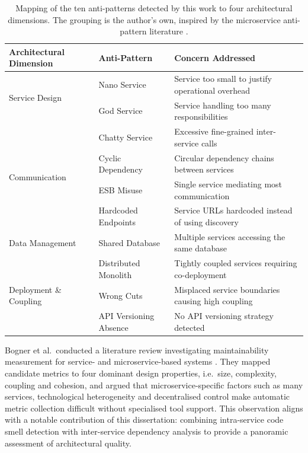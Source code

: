 \begin{table}[htbp]
    \begin{center}
        \small
        \begin{tabular}{|l|l|p{170pt}|}
            \hline
            \textbf{Architectural Dimension} & \textbf{Anti-Pattern} & \textbf{Concern Addressed} \\
            \hline\hline
            \multirow{2}{*}{Service Design}
            & Nano Service   & Service too small to justify operational overhead \\
            \cline{2-3}
            & God Service    & Service handling too many responsibilities \\
            \hline
            \multirow{4}{*}{Communication}
            & Chatty Service       & Excessive fine-grained inter-service calls \\
            \cline{2-3}
            & Cyclic Dependency    & Circular dependency chains between services \\
            \cline{2-3}
            & ESB Misuse           & Single service mediating most communication \\
            \cline{2-3}
            & Hardcoded Endpoints  & Service URLs hardcoded instead of using discovery \\
            \hline
            Data Management
            & Shared Database      & Multiple services accessing the same database \\
            \hline
            \multirow{3}{*}{Deployment \& Coupling}
            & Distributed Monolith    & Tightly coupled services requiring co-deployment \\
            \cline{2-3}
            & Wrong Cuts              & Misplaced service boundaries causing high coupling \\
            \cline{2-3}
            & API Versioning Absence  & No API versioning strategy detected \\
            \hline
        \end{tabular}
    \end{center}
    \caption{Mapping of the ten anti-patterns detected by this work to four architectural dimensions. The grouping is the author's own, inspired by the microservice anti-pattern literature \cite{Taibi2018, Taibi2020}.}
    \label{tab:antipattern-dimensions}
\end{table}

Bogner et al.\ conducted a literature review investigating maintainability measurement for service- and microservice-based systems \cite{Bogner2019}. They mapped candidate metrics to four dominant design properties, i.e.\ size, complexity, coupling and cohesion, and argued that microservice-specific factors such as many services, technological heterogeneity and decentralised control make automatic metric collection difficult without specialised tool support. This observation aligns with a notable contribution of this dissertation: combining intra-service code smell detection with inter-service dependency analysis to provide a panoramic assessment of architectural quality.

